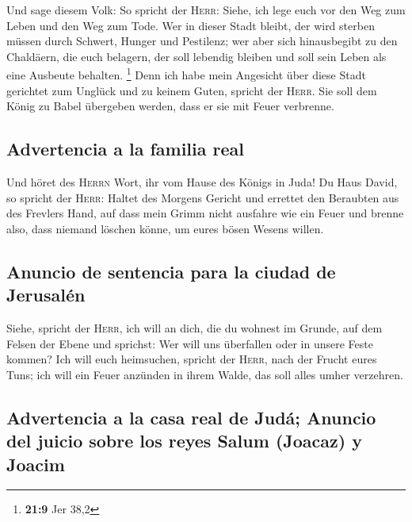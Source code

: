  Und sage diesem Volk: So spricht der \textsc{Herr}:
Siehe, ich lege euch vor den Weg zum Leben und den Weg zum Tode.
 Wer in dieser Stadt bleibt, der wird sterben müssen durch
Schwert, Hunger und Pestilenz; wer aber sich hinausbegibt zu den
Chaldäern, die euch belagern, der soll lebendig bleiben und soll sein
Leben als eine Ausbeute behalten. \footnote{\textbf{21:9} Jer 38,2}
 Denn ich habe mein Angesicht über diese Stadt gerichtet
zum Unglück und zu keinem Guten, spricht der \textsc{Herr}. Sie soll dem
König zu Babel übergeben werden, dass er sie mit Feuer verbrenne.

\hypertarget{advertencia-a-la-familia-real}{%
\subsection{Advertencia a la familia
real}\label{advertencia-a-la-familia-real}}

 Und höret des \textsc{Herrn} Wort, ihr vom Hause des
Königs in Juda!  Du Haus David, so spricht der
\textsc{Herr}: Haltet des Morgens Gericht und errettet den Beraubten aus
des Frevlers Hand, auf dass mein Grimm nicht ausfahre wie ein Feuer und
brenne also, dass niemand löschen könne, um eures bösen Wesens willen.

\hypertarget{anuncio-de-sentencia-para-la-ciudad-de-jerusaluxe9n}{%
\subsection{Anuncio de sentencia para la ciudad de
Jerusalén}\label{anuncio-de-sentencia-para-la-ciudad-de-jerusaluxe9n}}

 Siehe, spricht der \textsc{Herr}, ich will an dich, die
du wohnest im Grunde, auf dem Felsen der Ebene und sprichst: Wer will
uns überfallen oder in unsere Feste kommen?  Ich will
euch heimsuchen, spricht der \textsc{Herr}, nach der Frucht eures Tuns;
ich will ein Feuer anzünden in ihrem Walde, das soll alles umher
verzehren.

\hypertarget{advertencia-a-la-casa-real-de-juduxe1-anuncio-del-juicio-sobre-los-reyes-salum-joacaz-y-joacim}{%
\subsection{Advertencia a la casa real de Judá; Anuncio del juicio sobre
los reyes Salum (Joacaz) y
Joacim}\label{advertencia-a-la-casa-real-de-juduxe1-anuncio-del-juicio-sobre-los-reyes-salum-joacaz-y-joacim}}

